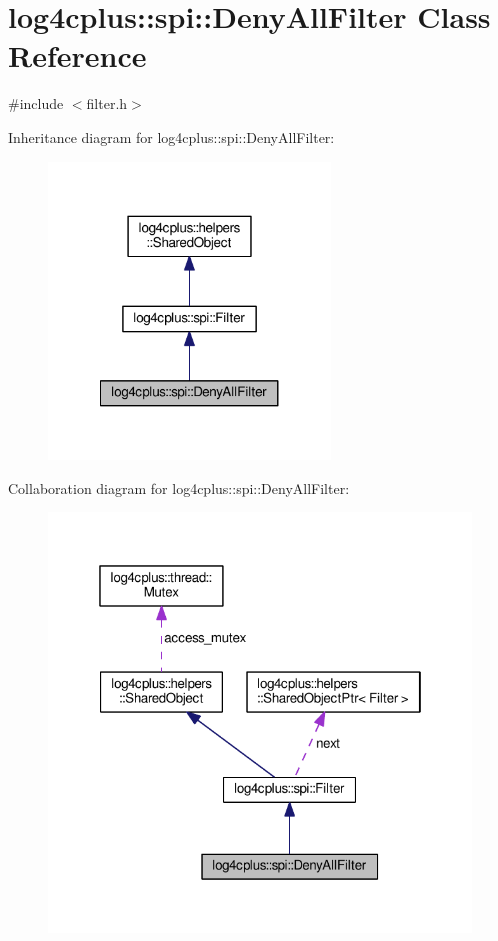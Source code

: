 \hypertarget{classlog4cplus_1_1spi_1_1DenyAllFilter}{\section{log4cplus\-:\-:spi\-:\-:Deny\-All\-Filter Class Reference}
\label{classlog4cplus_1_1spi_1_1DenyAllFilter}
}


{\ttfamily \#include $<$filter.\-h$>$}



Inheritance diagram for log4cplus\-:\-:spi\-:\-:Deny\-All\-Filter\-:
\nopagebreak
\begin{figure}[H]
\begin{center}
\leavevmode
\includegraphics[width=212pt]{classlog4cplus_1_1spi_1_1DenyAllFilter__inherit__graph}
\end{center}
\end{figure}


Collaboration diagram for log4cplus\-:\-:spi\-:\-:Deny\-All\-Filter\-:
\nopagebreak
\begin{figure}[H]
\begin{center}
\leavevmode
\includegraphics[width=321pt]{classlog4cplus_1_1spi_1_1DenyAllFilter__coll__graph}
\end{center}
\end{figure}
